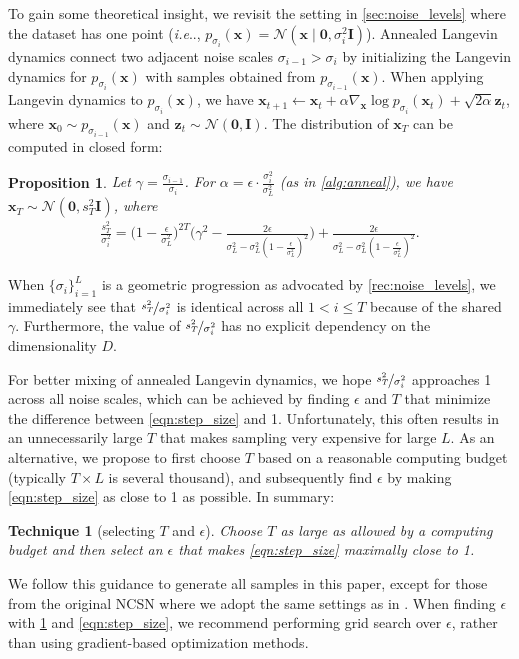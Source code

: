 \documentclass{article}
\makeatletter
\newcommand{\mcal}{\mathcal}
\newtheorem{recipe}{Technique}
\newtheorem{proposition}{Proposition}
\def\@onedot{\ifx\@let@token.\else.\null\fi\xspace}
\DeclareRobustCommand\onedot{\futurelet\@let@token\@onedot}
\newcommand{\bfx}{\mathbf{x}}
\newcommand{\bfz}{\mathbf{z}}
\newcommand{\bfI}{\mathbf{I}}
\newcommand{\bfzero}{\mathbf{0}}
\def\ie{\emph{i.e}\onedot}
\makeatother
\begin{document}
To gain some theoretical insight, we revisit the setting in \cref{sec:noise_levels} where the dataset has one point (\ie, $p_{\sigma_i}(\bfx) = \mcal{N}(\bfx \mid \bfzero, \sigma_i^2 \bfI)$). Annealed Langevin dynamics connect two adjacent noise scales $\sigma_{i-1} > \sigma_i$ by initializing the Langevin dynamics for $p_{\sigma_i}(\bfx)$ with samples obtained from $p_{\sigma_{i-1}}(\bfx)$. When applying Langevin dynamics to $p_{\sigma_i}(\bfx)$, we have $\bfx_{t+1} \gets \bfx_t + \alpha \nabla_\bfx \log p_{\sigma_i}(\bfx_t) + \sqrt{2\alpha}\bfz_t$, where $\bfx_0 \sim p_{\sigma_{i-1}}(\bfx)$ and $\bfz_t \sim \mcal{N}(\bfzero, \bfI)$. The distribution of $\bfx_T$ can be computed in closed form:
\begin{proposition}\label{prop:langevin}
Let $\gamma = \frac{\sigma_{i-1}}{\sigma_i}$. For $\alpha = \epsilon\cdot  \frac{\sigma_i^2}{\sigma_L^2}$ (as in \cref{alg:anneal}), we have $\bfx_T \sim \mcal{N}(\bfzero, s^2_T \bfI)$, where
\begin{align}
    \frac{s^2_T}{\sigma_i^2} =  \bigg( 1 - \frac{\epsilon}{\sigma_L^2} \bigg)^{2T}\Bigg( \gamma^2 - \frac{2\epsilon}{\sigma_L^2 - \sigma_L^2 \left(1 - \frac{\epsilon}{\sigma_L^2} \right)^2} \Bigg) + \frac{2\epsilon}{\sigma_L^2 - \sigma_L^2 \left( 1 - \frac{\epsilon}{\sigma_L^2} \right)^2}.\label{eqn:step_size}
\end{align}
\end{proposition}
When $\{\sigma_i\}_{i=1}^L$ is a geometric progression as advocated by \cref{rec:noise_levels}, we immediately see that $\nicefrac{s^2_T}{\sigma_i^2}$ is identical across all $1 < i \leq T$ because of the shared $\gamma$. Furthermore, the value of $\nicefrac{s^2_T}{\sigma_i^2}$ has no explicit dependency on the dimensionality $D$. 

For better mixing of annealed Langevin dynamics, we hope $\nicefrac{s^2_T}{\sigma_i^2}$ 
approaches 1 across all noise scales, which can be achieved by finding $\epsilon$ and $T$ that minimize the difference between \cref{eqn:step_size} and 1. Unfortunately, this often results in an unnecessarily large $T$ that makes sampling very expensive for large $L$. As an alternative, we propose to first choose $T$ based on a reasonable computing budget (typically $T \times L$ is several thousand), and subsequently find $\epsilon$ by making \cref{eqn:step_size} as close to 1 as possible.
In summary:
\begin{recipe}[selecting $T$ and $\epsilon$]\label{rec:langevin}
    Choose $T$ as large as allowed by a computing budget and then select an $\epsilon$ that makes \cref{eqn:step_size} maximally close to 1.
\end{recipe}
We follow this guidance to generate all samples in this paper, except for those from the original NCSN where we adopt the same settings as in \cite{song2019generative}. When finding $\epsilon$ with \cref{rec:langevin} and \cref{eqn:step_size}, we recommend performing grid search over $\epsilon$, rather than using gradient-based optimization methods.
\end{document}
